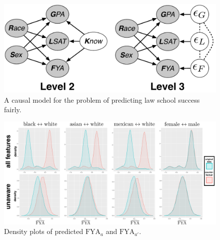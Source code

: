 
\begin{figure}[th]
\begin{center}
\vspace{-1ex}
\centerline{\includegraphics[width=0.8\columnwidth]{law_school_model}}
\vspace{-2ex}
\caption{A causal model for the problem of predicting law school success fairly.\label{figure.law_school}\vspace{-2ex}}
\vspace{-2ex}
\end{center}
\end{figure}


\begin{figure}[th]
\begin{center}
 \label{figure.counterfactual}
\vspace{-1ex}
\centerline{\includegraphics[width=\columnwidth]{counterfactual}}
\vspace{-2ex}
\caption{Density plots of predicted $\mbox{FYA}_a$ and $\mbox{FYA}_{a'}$.}
\vspace{-2ex}
\end{center}
\end{figure}


